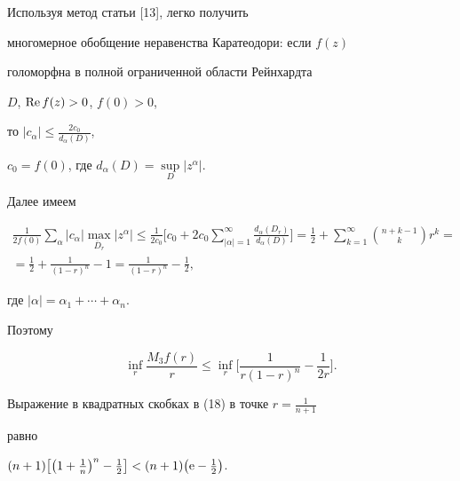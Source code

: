 \begin{pf}


Используя метод статьи [13], легко получить


многомерное обобщение неравенства Каратеодори: если $f(z)$


голоморфна в полной ограниченной области Рейнхардта


$D$, $\operatorname{Re} f(z)>0$, $f(0)>0$,


то $|c_{\alpha}|\leq\frac{2c_0}{d_{\alpha}(D)}$,


$c_0=f(0)$, где $d_{\alpha}(D)=\sup\limits_D|z^{\alpha}|$.


Далее имеем


\begin{multline*}


\frac{1}{2f(0)}\sum\limits_{\alpha}|c_{\alpha}|\max\limits_


{{\overline{D}}_r}|z^{\alpha}|\leq


\frac{1}{2c_0}\bigg[c_0+2c_0\sum\limits_{|{\alpha}|=1}^{\infty}


\frac{d_{\alpha}(D_r)}{d_{\alpha}(D)}\bigg]=


\frac{1}{2}+\sum\limits_{k=1}^{\infty}{{n+k-1}\choose k}r^k= \\


%


=\frac{1}{2}+\frac{1}{(1-r)^n}-1=\frac{1}{(1-r)^n}-\frac{1}{2},


\end{multline*}


где $|{\alpha}|={\alpha}_1+\dotsb+{\alpha}_n$.


Поэтому


\begin{equation}


\inf\limits_r\frac{M_3f(r)}{r}\leq\inf\limits_r\bigg[\frac{1}{r(1-r)^n}-


\frac{1}{2r} \bigg].


\end{equation}


Выражение в квадратных скобках в (18) в точке $r=\frac{1}{n+1}$


равно


$(n+1)\big[{\big(1+\frac{1}{n}\big)^n-\frac12}\big]<\linebreak


(n+1)\big(\mathrm e-{\frac{1}{2}}\big)$.


\end{pf}





